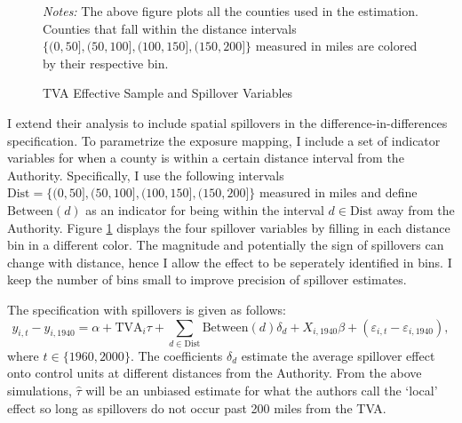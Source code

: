 \documentclass[11pt]{article}
\begin{document}
\begin{figure}[tb!]
    \caption{TVA Effective Sample and Spillover Variables}
    \label{fig:tva_sample}

    {\centering
    }

    {\footnotesize \textit{Notes:} The above figure plots all the counties used in the estimation. Counties that fall within the distance intervals $\{ (0, 50], (50, 100], (100, 150], (150, 200] \}$ measured in miles are colored by their respective bin.}
\end{figure}

I extend their analysis to include spatial spillovers in the difference-in-differences specification. To parametrize the exposure mapping, I include a set of indicator variables for when a county is within a certain distance interval from the Authority. Specifically, I use the following intervals $\text{Dist} = \{(0, 50], (50, 100], (100, 150], (150, 200]\}$ measured in miles and define $\text{Between}(d)$ as an indicator for being within the interval $d \in \text{Dist}$ away from the Authority. Figure \ref{fig:tva_sample} displays the four spillover variables by filling in each distance bin in a different color. The magnitude and potentially the sign of spillovers can change with distance, hence I allow the effect to be seperately identified in bins. I keep the number of bins small to improve precision of spillover estimates. 

The specification with spillovers is given as follows:  
\begin{equation}\label{eq:tva_spillover}
    y_{i, t} - y_{i, 1940} = \alpha + \text{TVA}_i \tau + \sum_{d \in \text{Dist}} \text{Between}(d)\delta_d + X_{i, 1940} \beta + (\varepsilon_{i, t} - \varepsilon_{i, 1940}),
\end{equation} 
where $t \in \{1960, 2000\}$. The coefficients $\delta_d$ estimate the average spillover effect onto control units at different distances from the Authority. From the above simulations, $\hat{\tau}$ will be an unbiased estimate for what the authors call the `local' effect so long as spillovers do not occur past 200 miles from the TVA.
\end{document}
